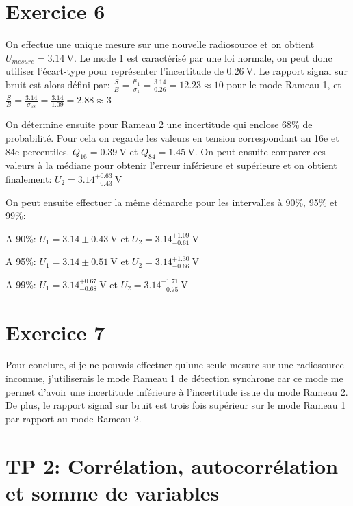 \documentclass[a4paper, 11pt]{article}
\begin{document}
	\section{Exercice 6}
	
	On effectue une unique mesure sur une nouvelle radiosource et on obtient $U_{mesure} = 3.14 \ \mathrm{V}$. Le mode 1 est caractérisé par une loi normale, on peut donc utiliser l'écart-type pour représenter l'incertitude de $0.26 \ \mathrm{V}$. Le rapport signal sur bruit est alors défini par: $\frac{S}{B} = \frac{\mu_1}{\sigma_1} = \frac{3.14}{0.26} = 12.23 \approx 10$ pour le mode Rameau 1, et $\frac{S}{B} = \frac{3.14}{\sigma_{68}} = \frac{3.14}{1.09} = 2.88 \approx 3$
	
	On détermine ensuite pour Rameau 2 une incertitude qui enclose 68\% de probabilité. Pour cela on regarde les valeurs en tension correspondant au 16e et 84e percentiles. $Q_{16} = 0.39 \ \mathrm{V}$ et  $Q_{84} = 1.45 \ \mathrm{V}$. On peut ensuite comparer ces valeurs à la médiane pour obtenir l'erreur inférieure et supérieure et on obtient finalement: $U_2 = 3.14^{+0.63}_{-0.43} \ \mathrm{V}$
	
	On peut ensuite effectuer la même démarche pour les intervalles à 90\%, 95\% et 99\%:
	
	A 90\%: $U_1 = 3.14\pm 0.43 \ \mathrm{V}$ et $U_2 = 3.14^{+1.09}_{-0.61} \ \mathrm{V}$
	
	A 95\%: $U_1 = 3.14\pm 0.51 \ \mathrm{V}$ et $U_2 = 3.14^{+1.30}_{-0.66} \ \mathrm{V}$
	
	A 99\%: $U_1 = 3.14^{+0.67}_{-0.68} \ \mathrm{V}$ et $U_2 = 3.14^{+1.71}_{-0.75} \ \mathrm{V}$
	
	\section{Exercice 7}
	
	Pour conclure, si je ne pouvais effectuer qu'une seule mesure sur une radiosource inconnue, j'utiliserais le mode Rameau 1 de détection synchrone car ce mode me permet d'avoir une incertitude inférieure à l'incertitude issue du mode Rameau 2. De plus, le rapport signal sur bruit est trois fois supérieur sur le mode Rameau 1 par rapport au mode Rameau 2.
	
	\section{TP 2: Corrélation, autocorrélation et somme de variables}
	
\end{document}
